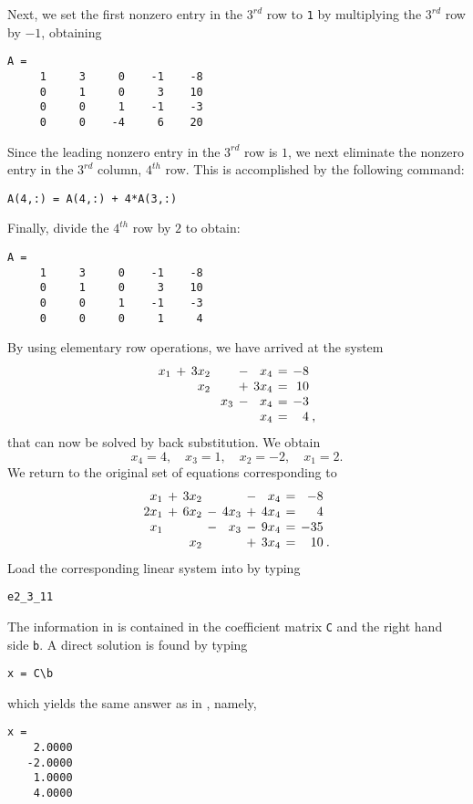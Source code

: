 \documentclass{ximera}
\begin{document}
Next, we set the first nonzero entry in the $3^{rd}$ row to {\tt 1}
by multiplying the $3^{rd}$ row by $-1$, obtaining
\begin{verbatim}
A =
     1     3     0    -1    -8
     0     1     0     3    10
     0     0     1    -1    -3
     0     0    -4     6    20
\end{verbatim}

Since the leading nonzero entry in the $3^{rd}$ row is $1$,  we
next eliminate the nonzero entry in the $3^{rd}$ column,
$4^{th}$ row. This is accomplished by the following \Matlab
command:
\begin{verbatim}
A(4,:) = A(4,:) + 4*A(3,:)
\end{verbatim}
Finally, divide the $4^{th}$ row by $2$ to obtain:
\begin{verbatim}
A =
     1     3     0    -1    -8
     0     1     0     3    10
     0     0     1    -1    -3
     0     0     0     1     4
\end{verbatim}

By using elementary row operations, we have arrived at the system
\begin{equation}
\arraycolsep 2pt
\begin{array}{rcrcrcrcrl}
  x_1 & + & 3x_2 &   &     & - &  x_4 & = &  -8 & \\
      &   &  x_2 &   &     & + & 3x_4 & = &  10 & \\
      &   &      &   & x_3 & - &  x_4 & = &  -3 & \\
      &   &      &   &     &   &  x_4 & = &   4 &\! ,
\end{array}
\end{equation}
that can now be solved by back substitution.  We obtain
\begin{equation} \label{ans1}
        x_4 = 4,\quad x_3 = 1,\quad x_2 = -2,\quad x_1 = 2.
\end{equation}
We return to the original set of equations corresponding to
\begin{equation*}    \label{examp4_con}
\arraycolsep 2pt
\begin{array}{rcrcrcrcrl}
  x_1 & + & 3x_2 &   &      & - &  x_4 & = &  -8  & \\
 2x_1 & + & 6x_2 & - & 4x_3 & + & 4x_4 & = &   4  & \\
  x_1 &   &      & - &  x_3 & - & 9x_4 & = & -35  & \\
      &   &  x_2 &   &      & + & 3x_4 & = &  10  & \! .
\end{array}
\end{equation*}
Load the corresponding linear system into \Matlab by typing
\begin{verbatim}
e2_3_11
\end{verbatim}
The information in  is contained in the
coefficient matrix {\tt C} and the right hand side {\tt b}.
A direct solution is found by typing
\begin{verbatim}
x = C\b
\end{verbatim}
which yields the same answer as in , namely,
\begin{verbatim}
x =
    2.0000
   -2.0000
    1.0000
    4.0000
\end{verbatim}
\end{document}
